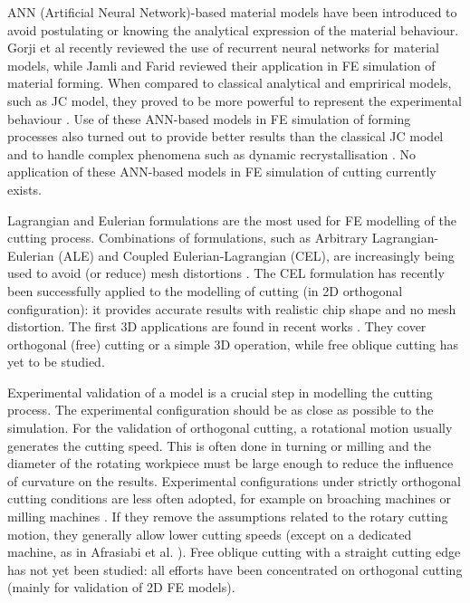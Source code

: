 \documentclass[preprint,12pt,times]{elsarticle}
\begin{document}
ANN (Artificial Neural Network)-based material models have been introduced to avoid postulating or knowing the analytical expression of the material behaviour. Gorji et al \cite{gorji_Potential_2020} recently reviewed the use of recurrent neural networks for material models, while Jamli and Farid \cite{jamli_Sustainability_2019} reviewed their application in FE simulation of material forming. When compared to classical analytical and emprirical models, such as JC model, they proved to be more powerful to represent the experimental behaviour \cite{tizemha_Interpolation_2023}. Use of these ANN-based models in FE simulation of forming processes also turned out to provide better results than the classical JC model \cite{pantale_Development_2023} and to handle complex phenomena such as dynamic recrystallisation \cite{tizemha_Artificial_2023}. No application of these ANN-based models in FE simulation of cutting currently exists.

Lagrangian and Eulerian formulations are the most used for FE modelling of the cutting process. Combinations of formulations, such as Arbitrary Lagrangian-Eulerian (ALE) and Coupled Eulerian-Lagrangian (CEL), are increasingly being used to avoid (or reduce) mesh distortions \cite{ducobu_Application_2016}. The CEL formulation has recently been successfully applied to the modelling of cutting (in 2D orthogonal configuration): it provides accurate results with realistic chip shape and no mesh distortion. The first 3D applications are found in recent works \cite{xu_Simulation_2021, ducobu_Finite_2017, ambrosio_New_2022, vovk_Finite_2020, hardt_Three_2021}. They cover orthogonal (free) cutting or a simple 3D operation, while free oblique cutting has yet to be studied.

Experimental validation of a model is a crucial step in modelling the cutting process. The experimental configuration should be as close as possible to the simulation. For the validation of orthogonal cutting, a rotational motion usually generates the cutting speed. This is often done in turning \cite{agmell_Development_2018} or milling \cite{xu_Simulation_2021} and the diameter of the rotating workpiece must be large enough to reduce the influence of curvature on the results. Experimental configurations under strictly orthogonal cutting conditions are less often adopted, for example on broaching machines \cite{abouridouane_Friction_2021} or milling machines \cite{ducobu_Experimental_2015, sela_Measurement_2021}. If they remove the assumptions related to the rotary cutting motion, they generally allow lower cutting speeds (except on a dedicated machine, as in Afrasiabi et al. \cite{afrasiabi_NumericalExperimental_2021}). Free oblique cutting with a straight cutting edge has not yet been studied: all efforts have been concentrated on orthogonal cutting (mainly for validation of 2D FE models).
\end{document}
